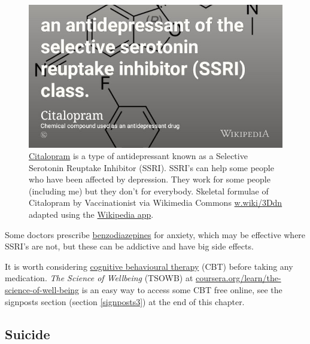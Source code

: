 \documentclass[
]{book}
\begin{document}
\begin{figure}

{\centering \includegraphics[width=0.99\linewidth]{images/citalopram} 

}

\caption{\href{https://www.nhs.uk/medicines/citalopram/}{Citalopram} is a type of antidepressant known as a Selective Serotonin Reuptake Inhibitor (SSRI). SSRI's can help some people who have been affected by depression. They work for some people (including me) but they don't for everybody. Skeletal formulae of Citalopram by Vaccinationist via Wikimedia Commons \href{https://w.wiki/3Ddn}{w.wiki/3Ddn} adapted using the \href{https://apps.apple.com/gb/app/wikipedia/id324715238}{Wikipedia app}.}\label{fig:citalopram-fig}
\end{figure}



Some doctors prescribe \href{https://www.mind.org.uk/information-support/drugs-and-treatments/sleeping-pills-and-minor-tranquillisers/about-benzodiazepines/}{benzodiazepines} for anxiety, which may be effective where SSRI's are not, but these can be addictive and have big side effects.

It is worth considering \href{https://en.wikipedia.org/wiki/Cognitive_behavioral_therapy}{cognitive behavioural therapy} (CBT) before taking any medication. \emph{The Science of Wellbeing} (TSOWB) at \href{https://www.coursera.org/learn/the-science-of-well-being}{coursera.org/learn/the-science-of-well-being} is an easy way to access some CBT free online, see the signposts section (section \ref{signposts3}) at the end of this chapter. \citep{lauriesantos}

\hypertarget{suicide}{%
\subsection{Suicide}\label{suicide}}
\end{document}
